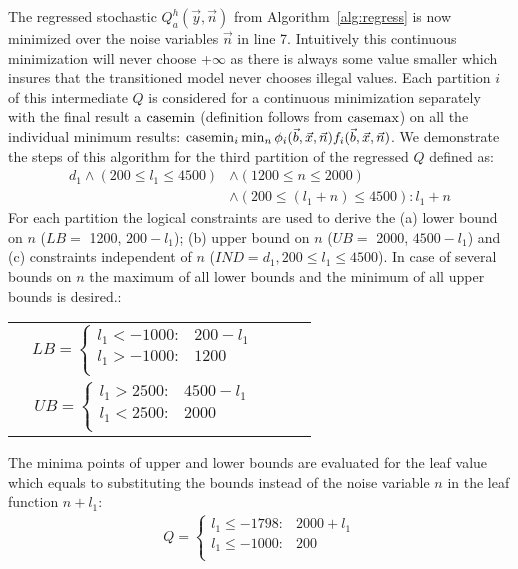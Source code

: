 \begin{itemize}
The regressed stochastic $Q_a^{h}(\vec{y},\vec{n})$ from Algorithm~\ref{alg:regress} is now minimized over the noise variables $\vec{n}$ in line 7. Intuitively this continuous minimization will never choose +$\infty$ as there is always some value smaller which insures that the transitioned model never chooses illegal values. Each partition $i$ of this intermediate $Q$ is considered for a continuous minimization separately with the final result a $\mathrm{casemin}$ (definition follows from $\mathrm{casemax}$) on all the individual minimum results: $\mathrm{casemin}_i \min_n \phi_i(\vec{b},\vec{x},\vec{n}) f_i(\vec{b},\vec{x},\vec{n})$.  
We demonstrate the steps of this algorithm for the third partition of the regressed $Q$ defined as:
{\footnotesize
\begin{align*}
d_1 \land (200\leq l_1\leq 4500) &\land (1200\leq n\leq 2000) \\
& \land (200\leq (l_1+n)\leq 4500): l_1 +n 
\end{align*}}
For each partition the logical constraints are used to derive the (a) lower bound on $n$ ($LB =$ 1200, $200 -l_1$); (b) upper bound on $n$ ($UB =$ 2000, $4500- l_1$)  and (c) constraints independent of $n$ ($IND= d_1, 200 \leq l_1 \leq 4500$). In case of several bounds on $n$ the maximum of all lower bounds and the minimum of all upper bounds is desired.:
{\footnotesize
\begin{center}
\begin{tabular}{r c c c l}
&
$
LB =  
\begin{cases}
 l_1 < -1000 : & 200 - l_1 \\ 
 l_1 > -1000 : & 1200 \\ 
\end{cases} 
$
\\
&
$ UB =  
\begin{cases}
l_1 >2500 : & 4500 - l_1 \\ 
l_1<2500 : & 2000 \\ 
\end{cases} 
$
\end{tabular}
\end{center}
}
The minima points of upper and lower bounds are evaluated for the leaf value which equals to substituting the bounds instead of the noise variable $n$ in the leaf function $n+ l_1$:
{\footnotesize
\begin{align}
Q =  
\begin{cases}
 l_1\leq - 1798 :&  2000 + l_1 \\
 l_1\leq - 1000 :&  200 \\

\end{cases}
\end{align}}
\end{itemize}
